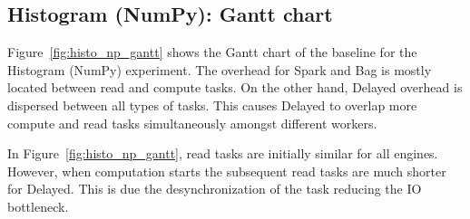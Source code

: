 \documentclass[conference]{IEEEtran}
\begin{document}
\subsection{Histogram (NumPy): Gantt chart}
Figure~\ref{fig:histo_np_gantt} shows the Gantt chart of the baseline for the
Histogram (NumPy) experiment. The overhead for Spark and Bag is mostly located
between read and compute tasks. On the other hand, Delayed
overhead is dispersed between all types of tasks. This causes Delayed to
overlap more compute and read tasks simultaneously amongst different workers.

In Figure~\ref{fig:histo_np_gantt}, read tasks are initially similar for all
engines. However, when computation starts the subsequent read tasks are much
shorter for Delayed. This is due the desynchronization of the task reducing the
IO bottleneck.
\end{document}
